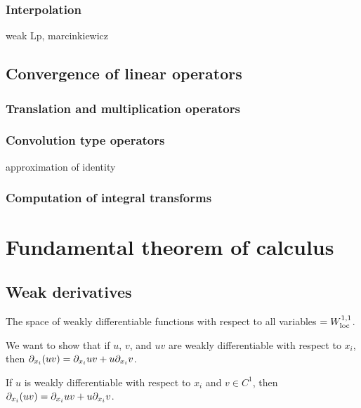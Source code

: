 \documentclass{../note}
\begin{document}
\section{Interpolation}
weak Lp, marcinkiewicz




\chapter{Convergence of linear operators}
\section{Translation and multiplication operators}

\section{Convolution type operators}
approximation of identity

\section{Computation of integral transforms}











\part{Fundamental theorem of calculus}

\chapter{Weak derivatives}

The space of weakly differentiable functions with respect to all variables $=W_{\mathrm{loc}}^{1,1}$.

\begin{prb}
We want to show that if $u$, $v$, and $uv$ are weakly differentiable with respect to $x_i$, then $\pd_{x_i}(uv)=\pd_{x_i}uv+u\pd_{x_i}v$.
\begin{parts}
\item If $u$ is weakly differentiable with respect to $x_i$ and $v\in C^1$, then $\pd_{x_i}(uv)=\pd_{x_i}uv+u\pd_{x_i}v$.
\end{parts}
\end{prb}
\end{document}
